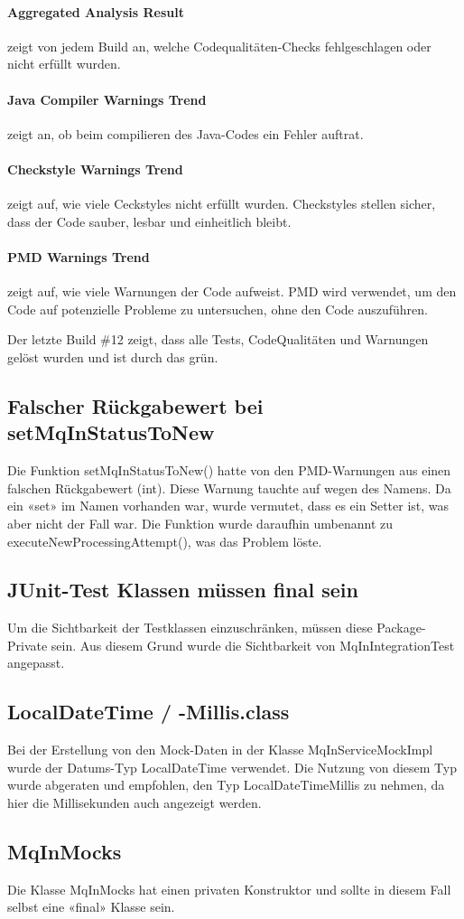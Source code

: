 \paragraph{Aggregated Analysis Result} zeigt von jedem Build an, welche Codequalitäten-Checks fehlgeschlagen oder nicht erfüllt wurden.
\paragraph{Java Compiler Warnings Trend} zeigt an, ob beim compilieren des Java-Codes ein Fehler auftrat.
\paragraph{Checkstyle Warnings Trend} zeigt auf, wie viele Ceckstyles nicht erfüllt wurden. Checkstyles stellen sicher, dass der Code sauber, lesbar und einheitlich bleibt.
\paragraph{PMD Warnings Trend} zeigt auf, wie viele Warnungen der Code aufweist. PMD wird verwendet, um den Code auf potenzielle Probleme zu untersuchen, ohne den Code auszuführen.\newline

\noindent Der letzte Build \#12 zeigt, dass alle Tests, CodeQualitäten und Warnungen gelöst wurden und ist durch das grün.

\subsection{Falscher Rückgabewert bei setMqInStatusToNew}
Die Funktion setMqInStatusToNew() hatte von den PMD-Warnungen aus einen falschen Rückgabewert (int). Diese Warnung tauchte auf wegen des Namens. Da ein «set» im Namen vorhanden war, wurde vermutet, dass es ein Setter ist, was aber nicht der Fall war. Die Funktion wurde daraufhin umbenannt zu executeNewProcessingAttempt(), was das Problem löste.

\subsection{JUnit-Test Klassen müssen final sein}
Um die Sichtbarkeit der Testklassen einzuschränken, müssen diese Package-Private sein. Aus diesem Grund wurde die Sichtbarkeit von MqInIntegrationTest angepasst.

\subsection{LocalDateTime / -Millis.class}
Bei der Erstellung von den Mock-Daten in der Klasse MqInServiceMockImpl wurde der Datums-Typ LocalDateTime verwendet. Die Nutzung von diesem Typ wurde abgeraten und empfohlen, den Typ LocalDateTimeMillis zu nehmen, da hier die Millisekunden auch angezeigt werden.

\subsection{MqInMocks}
Die Klasse MqInMocks hat einen privaten Konstruktor und sollte in diesem Fall selbst eine «final» Klasse sein.

\newpage
